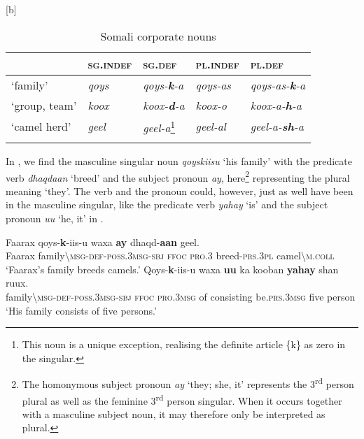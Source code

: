 \documentclass[output=paper]{langsci/langscibook}
\begin{document}
\begin{table}
\caption{Somali corporate nouns}[b]
\label{tab:nilsson:14}
\begin{tabularx}{\textwidth}{XlXlX}
\lsptoprule
& {\textsc{sg.indef}}  & {\textsc{sg.def}} & {\textsc{pl.indef}} & {\textsc{pl.def}}\\
\midrule 
{‘family’} & {\textit{qoys}} &  {\textit{qoys-}\textbf{\textit{k}}\textit{-a}} & {\textit{qoys-as}} & {\textit{qoys-as-}\textbf{\textit{k}}\textit{-a}}\\
{‘group, team’} & {\textit{koox}} &  {\textit{koox-}\textbf{\textit{d}}\textit{-a}} & {\textit{koox-o}} & {\textit{koox-a-}\textbf{\textit{h}}\textit{-a}}\\
{‘camel herd’} & {\textit{geel}} &  {\textit{geel-a}}\footnote{This noun is a unique exception, realising the definite article \{k\} as zero in the singular.} & {\textit{geel-al}} & {\textit{geel-a-}\textbf{\textit{sh}}\textit{-a}}\\
\lspbottomrule
\end{tabularx}

\end{table} 



In , we find the masculine singular noun \textit{qoyskiisu} ‘his family’ with the predicate verb \textit{dhaqdaan} ‘breed’ and the subject pronoun \textit{ay}, here\footnote{The homonymous subject pronoun \textit{ay} ‘they; she, it’ represents the 3\textsuperscript{rd} person plural as well as the feminine 3\textsuperscript{rd} person singular. When it occurs together with a masculine subject noun, it may therefore only be interpreted as plural.} representing the plural meaning ‘they’. The verb and the pronoun could, however, just as well have been in the masculine singular, like the predicate verb \textit{yahay} ‘is’ and the subject pronoun \textit{uu} ‘he, it’ in .

\ea\label{ex:nilsson:8}
\gll Faarax  qoys-\textbf{k}-iis-u        waxa  \textbf{ay}    dhaqd-\textbf{aan}  geel.\\
     Faarax  family{\textbackslash}\textsc{msg-def-poss.3msg-sbj}    \textsc{ffoc}  \textsc{pro.3}  breed-\textsc{prs.3pl}  camel{\textbackslash}\textsc{m.coll}\\
\glt ‘Faarax’s family breeds camels.’
\z 
\ea\label{ex:nilsson:9}
\gll Qoys-\textbf{k}-iis-u      waxa  \textbf{uu}    ka  kooban    \textbf{yahay}    shan  ruux.\\
     family{\textbackslash}\textsc{msg-def-poss.3msg-sbj}  \textsc{ffoc}  \textsc{pro.3msg}  of  consisting  be.\textsc{prs.3msg}  five  person\\
\glt ‘His family consists of five persons.’
\z
\end{document}

